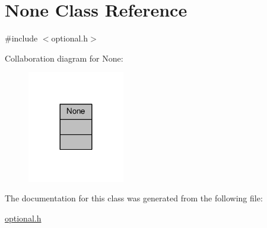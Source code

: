 \hypertarget{classNone}{}\section{None Class Reference}
\label{classNone}


{\ttfamily \#include $<$optional.\+h$>$}



Collaboration diagram for None\+:\nopagebreak
\begin{figure}[H]
\begin{center}
\leavevmode
\includegraphics[width=120pt]{classNone__coll__graph}
\end{center}
\end{figure}


The documentation for this class was generated from the following file\+:\begin{DoxyCompactItemize}
\item 
\hyperlink{optional_8h}{optional.\+h}\end{DoxyCompactItemize}
